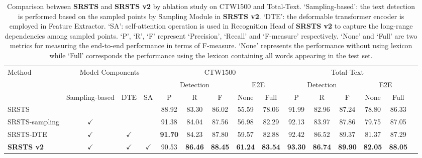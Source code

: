 \begin{comment}
    \midrule
SRSTS-sampling  & $\checkmark$ & & & 91.38 & 84.04&87.56& 56.98 & 82.29 & 92.13  &83.97 &87.86&79.75&87.05 & \textbf{20.22}  \\
    SRSTS-DTE  & $\checkmark$    & $\checkmark$ & &\textbf{91.70}&84.23&87.80&59.57&82.88 &92.42 &86.52 & 89.37 &81.37 & 87.29& 13.44  \\
    \midrule 
\textbf{SRSTS v2}  & $\checkmark$   & $\checkmark$ & $\checkmark$  &90.53 & \textbf{86.46}& \textbf{88.45}&\textbf{61.24} & \textbf{83.54 }&\textbf{93.30}& \textbf{86.74}&
\textbf{89.90} &\textbf{82.05}& \textbf{88.05}&12.86 \\
\bottomrule
  \end{tabular}
\end{table*}
\end{comment}
\begin{table*}[!t]
\renewcommand{\arraystretch}{1.1}
  \caption{Comparison between \textbf{SRSTS} and \textbf{SRSTS v2} by ablation study on CTW1500 and Total-Text. `Sampling-based': the text detection is performed based on the sampled points by Sampling Module in \textbf{SRSTS v2}. `DTE': the deformable transformer encoder is employed in Feature Extractor. `SA': self-attention operation is used in Recognition Head of \textbf{SRSTS v2} to capture the long-range dependencies among sampled points. `P’, `R’, `F’ represent `Precision', `Recall' and `F-measure' respectively. `None' and `Full' are two metrics for measuring the end-to-end performance in terms of F-measure. `None’ represents the performance without using lexicon while ‘Full’ corresponds the performance using the lexicon containing all words appearing in the test set.}
  \label{tab:ablative}
  \centering
\begin{tabular}{l|ccc|ccccc|cccccc}
    \toprule
\multirow{3}{*}{Method} & \multicolumn{3}{c|}{\multirow{2}{*}{Model Components}} &\multicolumn{5}{c|}{CTW1500} & \multicolumn{5}{c}{Total-Text}\\
    \cmidrule(lr){5-9}
    \cmidrule(lr){10-14}
& & & &\multicolumn{3}{c}{Detection} & \multicolumn{2}{c|}{E2E}&\multicolumn{3}{c}{Detection} & \multicolumn{2}{c}{E2E}\\
    \cmidrule(lr){2-4}
    \cmidrule(lr){5-7}
    \cmidrule(lr){8-9}
    \cmidrule(lr){10-12}
    \cmidrule(lr){13-14}
&Sampling-based & DTE & SA& P&R&F& None &Full& P&R&F& None &Full\\
\midrule
SRSTS~\cite{wu2022decoupling} & & &  & 88.92&83.30 &86.02 &55.59 &78.06 &91.99 & 82.96 &87.24&78.80& 86.33  \\
    \midrule
SRSTS-sampling  & $\checkmark$ & & & 91.38 & 84.04&87.56& 56.98 & 82.29 & 92.13  &83.97 &87.86&79.75&87.05   \\
    SRSTS-DTE  & $\checkmark$    & $\checkmark$ & &\textbf{91.70}&84.23&87.80&59.57&82.88 &92.42 &86.52 & 89.37 &81.37 & 87.29 \\
    \midrule 
\textbf{SRSTS v2}  & $\checkmark$   & $\checkmark$ & $\checkmark$  &90.53 & \textbf{86.46}& \textbf{88.45}&\textbf{61.24} & \textbf{83.54 }&\textbf{93.30}& \textbf{86.74}&
\textbf{89.90} &\textbf{82.05}& \textbf{88.05}\\
\bottomrule
  \end{tabular}
\end{table*}
